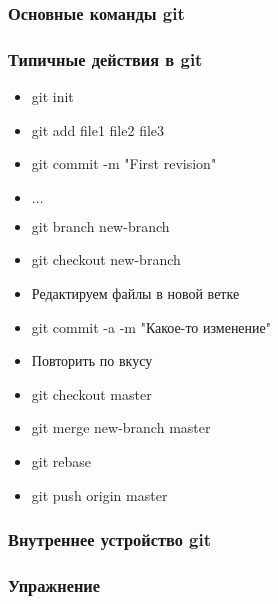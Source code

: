 \begin{frame}
 \frametitle{Основные команды git}
\end{frame}

\begin{frame}
 \frametitle{Типичные действия в git}
 \begin{itemize}
  \item git init
  \item git add file1 file2 file3
  \item git commit -m "First revision"
  \item $\dots$
  \item git branch new-branch
  \item git checkout new-branch
  \item Редактируем файлы в новой ветке
  \item git commit -a -m "Какое-то изменение"
  \item Повторить по вкусу
  \item git checkout master 
  \item git merge new-branch master
  \item git rebase 
  \item git push origin master
 \end{itemize}
\end{frame}

\begin{frame}
 \frametitle{Внутреннее устройство git}
\end{frame}

\begin{frame}
 \frametitle{Упражнение}
\end{frame}
